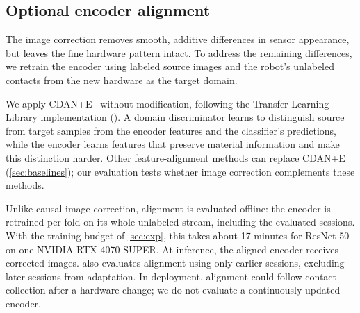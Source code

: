 \subsection{Optional encoder alignment}
The image correction removes smooth, additive differences in sensor appearance, but leaves the fine hardware pattern intact. To address the remaining differences, we retrain the encoder using labeled source images and the robot's unlabeled contacts from the new hardware as the target domain.

We apply CDAN+E~\cite{long2018cdan} without modification, following the Transfer-Learning-Library implementation (). A domain discriminator learns to distinguish source from target samples from the encoder features and the classifier's predictions, while the encoder learns features that preserve material information and make this distinction harder. Other feature-alignment methods can replace CDAN+E (\cref{sec:baselines}); our evaluation tests whether image correction complements these methods.

Unlike causal image correction, alignment is evaluated offline: the encoder is retrained per fold on its whole unlabeled stream, including the evaluated sessions. With the training budget of \cref{sec:exp}, this takes about 17 minutes for ResNet-50 on one NVIDIA RTX 4070 SUPER. At inference, the aligned encoder receives corrected images.  also evaluates alignment using only earlier sessions, excluding later sessions from adaptation. In deployment, alignment could follow contact collection after a hardware change; we do not evaluate a continuously updated encoder.
